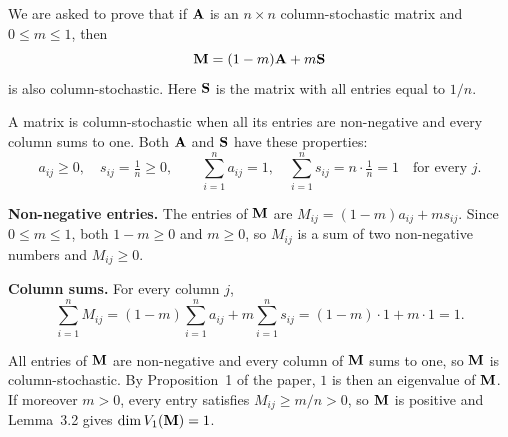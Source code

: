 

We are asked to prove that if $\mathbf{A}$ is an $n \times n$ column-stochastic matrix and $0 \le m \le 1$, then
\[
  \mathbf{M} = (1-m)\mathbf{A} + m\mathbf{S}
\]
is also column-stochastic. Here $\mathbf{S}$ is the matrix with all entries equal to $1/n$.


A matrix is column-stochastic when all its entries are non-negative and every column sums to one.
Both $\mathbf{A}$ and $\mathbf{S}$ have these properties:
\[
  a_{ij} \ge 0, \quad s_{ij} = \tfrac{1}{n} \ge 0, \qquad
  \sum_{i=1}^n a_{ij} = 1, \quad \sum_{i=1}^n s_{ij} = n \cdot \tfrac{1}{n} = 1 \quad \text{for every } j.
\]

\textbf{Non-negative entries.} The entries of $\mathbf{M}$ are $M_{ij} = (1-m)a_{ij} + m s_{ij}$.
Since $0 \le m \le 1$, both $1-m \ge 0$ and $m \ge 0$, so $M_{ij}$ is a sum of two non-negative numbers and $M_{ij} \ge 0$.

\textbf{Column sums.} For every column $j$,
\[
  \sum_{i=1}^n M_{ij} = (1-m)\sum_{i=1}^n a_{ij} + m\sum_{i=1}^n s_{ij} = (1-m)\cdot 1 + m \cdot 1 = 1 .
\]


All entries of $\mathbf{M}$ are non-negative and every column of $\mathbf{M}$ sums to one, so $\mathbf{M}$ is column-stochastic.
By Proposition~1 of the paper, $1$ is then an eigenvalue of $\mathbf{M}$.
If moreover $m > 0$, every entry satisfies $M_{ij} \ge m/n > 0$, so $\mathbf{M}$ is positive and Lemma~3.2 gives $\dim V_1(\mathbf{M}) = 1$.
